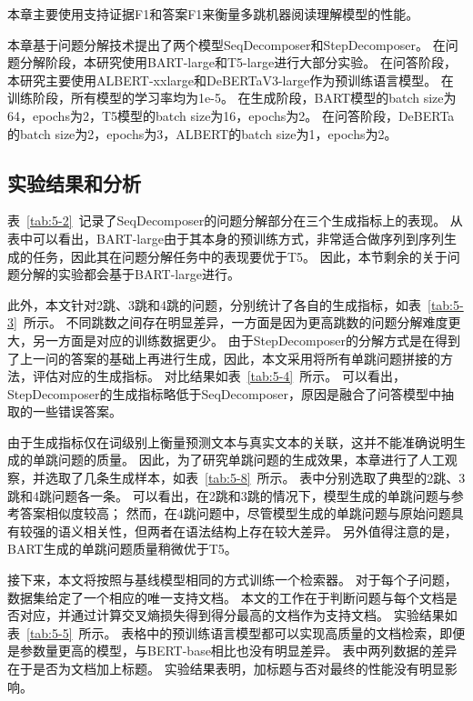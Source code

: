 本章主要使用支持证据F1和答案F1来衡量多跳机器阅读理解模型的性能。

本章基于问题分解技术提出了两个模型SeqDecomposer和StepDecomposer。
在问题分解阶段，本研究使用BART-large\cite{Lewis2019BARTDS}和T5-large\cite{Ni2021SentenceT5SS}进行大部分实验。
在问答阶段，本研究主要使用ALBERT-xxlarge\cite{lan2019albert}和DeBERTaV3-large作为预训练语言模型。
在训练阶段，所有模型的学习率均为1e-5。
在生成阶段，BART模型的batch size为64，epochs为2，T5模型的batch size为16，epochs为2。
在问答阶段，DeBERTa的batch size为2，epochs为3，ALBERT的batch size为1，epochs为2。

\subsection{实验结果和分析}
表~\ref{tab:5-2}~记录了SeqDecomposer的问题分解部分在三个生成指标上的表现。
从表中可以看出，BART-large由于其本身的预训练方式，非常适合做序列到序列生成的任务，因此其在问题分解任务中的表现要优于T5。
因此，本节剩余的关于问题分解的实验都会基于BART-large进行。



此外，本文针对2跳、3跳和4跳的问题，分别统计了各自的生成指标，如表~\ref{tab:5-3}~所示。
不同跳数之间存在明显差异，一方面是因为更高跳数的问题分解难度更大，另一方面是对应的训练数据更少。
由于StepDecomposer的分解方式是在得到了上一问的答案的基础上再进行生成，因此，本文采用将所有单跳问题拼接的方法，评估对应的生成指标。
对比结果如表~\ref{tab:5-4}~所示。
可以看出，StepDecomposer的生成指标略低于SeqDecomposer，原因是融合了问答模型中抽取的一些错误答案。






由于生成指标仅在词级别上衡量预测文本与真实文本的关联，这并不能准确说明生成的单跳问题的质量。
因此，为了研究单跳问题的生成效果，本章进行了人工观察，并选取了几条生成样本，如表~\ref{tab:5-8}~所示。
表中分别选取了典型的2跳、3跳和4跳问题各一条。
可以看出，在2跳和3跳的情况下，模型生成的单跳问题与参考答案相似度较高；
然而，在4跳问题中，尽管模型生成的单跳问题与原始问题具有较强的语义相关性，但两者在语法结构上存在较大差异。
另外值得注意的是，BART生成的单跳问题质量稍微优于T5。




接下来，本文将按照与基线模型相同的方式训练一个检索器。
对于每个子问题，数据集给定了一个相应的唯一支持文档。
本文的工作在于判断问题与每个文档是否对应，并通过计算交叉熵损失得到得分最高的文档作为支持文档。
实验结果如表~\ref{tab:5-5}~所示。
表格中的预训练语言模型都可以实现高质量的文档检索，即便是参数量更高的模型，与BERT-base相比也没有明显差异。
表中两列数据的差异在于是否为文档加上标题。
实验结果表明，加标题与否对最终的性能没有明显影响。

